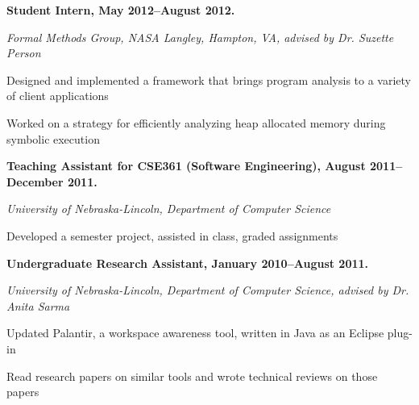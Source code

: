 \documentclass[10pt,letterpaper]{article}
\renewenvironment{itemize}{
  \begin{list}{}{
    \setlength{\leftmargin}{1.5em}
    \setlength{\itemsep}{0.25em}
    \setlength{\parskip}{0pt}
    \setlength{\parsep}{0.25em}
  }
}{
  \end{list}
}
\begin{document}
\begin{itemize}
\item \textbf{Student Intern, May 2012--August 2012.}
\item \emph{Formal Methods Group, NASA Langley, Hampton, VA, advised by Dr. Suzette Person}
    \begin{itemize}
    \item Designed and implemented a framework that brings program analysis to a variety of client applications
    \item Worked on a strategy for efficiently analyzing heap allocated
        memory during symbolic execution
    \end{itemize}
\end{itemize}

\begin{itemize}
\item \textbf{Teaching Assistant for CSE361 (Software Engineering), August 2011--December 2011.}
\item \emph{University of Nebraska-Lincoln, Department of Computer Science}
	\begin{itemize}
    \item Developed a semester project, assisted in class, graded assignments
	\end{itemize}
\end{itemize}

\begin{itemize}
\item \textbf{Undergraduate Research Assistant, January 2010--August 2011.}
\item \emph{University of Nebraska-Lincoln, Department of Computer Science, advised by Dr. Anita Sarma}
	\begin{itemize}
	\item Updated Palantir, a workspace awareness tool, written in Java as an Eclipse plug-in
	\item Read research papers on similar tools and wrote technical reviews on those papers
	\end{itemize}
\end{itemize}

\end{document}
